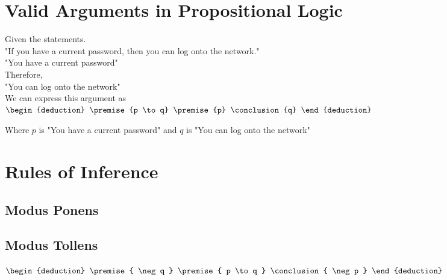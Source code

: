 \documentclass[12pt letter]{report}
\begin{document}
\section{Valid Arguments in Propositional Logic}

Given the statements.\\

"If you have  a current password, then you can log onto the network."\\

"You have a current password" \\

Therefore, \\

"You can log onto the network"\\

We can express this argument as\\

\begin{math}
  \begin{deduction}
    \premise{p \to q}
    \premise{p}
    \conclusion{q}
  \end{deduction}
\end{math}

Where $p$ is "You have a current password" and $q$ is "You can log onto the network"



\section{Rules of Inference}

\subsection{Modus Ponens}

\begin{deduction}
\end{deduction}

\subsection{Modus Tollens}

\begin{math}
  \begin{deduction}
    \premise{ \neg q }
    \premise{ p \to q }
    \conclusion{ \neg p }
  \end{deduction}
\end{math}
\end{document}
